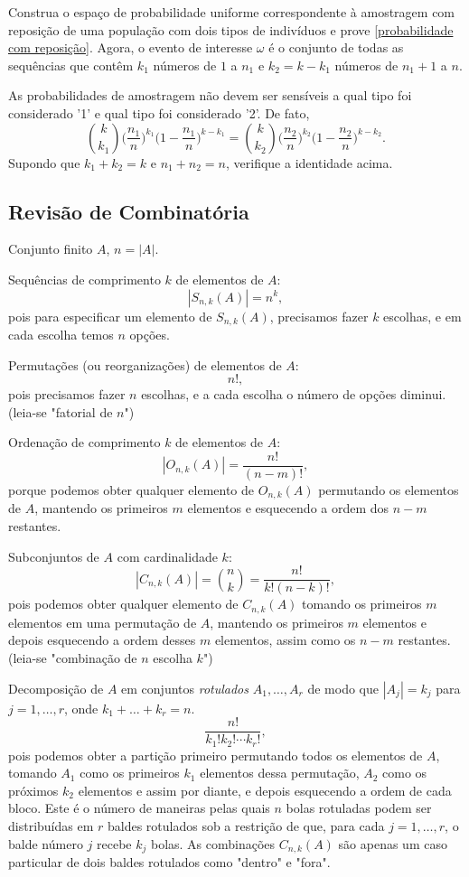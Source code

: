 \begin{exercise}
    Construa o espaço de probabilidade uniforme correspondente à amostragem com reposição de uma população com dois tipos de indivíduos e prove \eqref{probabilidade com reposição}.
    Agora, o evento de interesse $\omega$ é o conjunto de todas as sequências que contêm $k_1$ números de $1$ a $n_1$ e $k_2 = k - k_1$ números de $n_1+1$ a $n$.   
\end{exercise}

\begin{exercise}
As probabilidades de amostragem não devem ser sensíveis a qual tipo foi considerado '1' e qual tipo foi considerado '2'.
De fato,
\[
\binom{k}{k_1} \Big(\frac{n_1}{n}\Big)^{k_1} \Big(1-\frac{n_1}{n}\Big)^{k-k_1}
=
\binom{k}{k_2} \Big(\frac{n_2}{n}\Big)^{k_2} \Big(1-\frac{n_2}{n}\Big)^{k-k_2}.
\]
Supondo que $k_1+k_2=k$ e $n_1+n_2=n$, verifique a identidade acima.
\end{exercise}

\subsection*{Revisão de Combinatória}

Conjunto finito $ A $, $ n=|A| $.

Sequências de comprimento $ k $ de elementos de $ A $:
$$ |S_{n,k}(A)| = n^k ,$$
pois para especificar um elemento de
$ S_{n,k}(A) $, precisamos fazer $ k $ escolhas, e em cada escolha temos $ n $ opções.

Permutações (ou reorganizações) de elementos de $ A $:
$$ n! ,$$
pois precisamos fazer $ n $ escolhas, e a cada escolha o número de opções diminui.
(leia-se "fatorial de $ n $")

Ordenação de comprimento $ k $ de elementos de $ A $:
$$ |O_{n,k}(A) | = \frac{n!}{(n-m)!} , $$
porque podemos obter qualquer elemento de $ O_{n,k}(A) $ permutando os elementos de $ A $, mantendo os primeiros $ m $ elementos e esquecendo a ordem dos $ n-m $ restantes.

Subconjuntos de $ A $ com cardinalidade $ k $:
$$ |C_{n,k}(A)| = \binom{n}{k} = \frac{n!}{k! (n-k)!} , $$
pois podemos obter qualquer elemento de $ C_{n,k}(A) $ tomando os primeiros $ m $ elementos em uma permutação de $ A $, mantendo os primeiros $ m $ elementos e depois esquecendo a ordem desses $ m $ elementos, assim como os $ n-m $ restantes.
(leia-se "combinação de $ n $ escolha $ k $")

Decomposição de $ A $ em conjuntos \emph{rotulados} $ A_1, \dots, A_r $ de modo que $ |A_j|=k_j $ para $ j=1, \dots, r $, onde $ k_1+\dots+k_r = n $.
$$ \frac{n!}{k_1!k_2!\cdots k_r!} , $$
pois podemos obter a partição primeiro permutando todos os elementos de $ A $, tomando $ A_1 $ como os primeiros $ k_1 $ elementos dessa permutação, $ A_2 $ como os próximos $ k_2 $ elementos e assim por diante, e depois esquecendo a ordem de cada bloco.
Este é o número de maneiras pelas quais $ n $ bolas rotuladas podem ser distribuídas em $ r $ baldes rotulados sob a restrição de que, para cada $ j = 1, \dots, r $, o balde número $ j $ recebe $ k_j $ bolas.
As combinações $ C_{n,k}(A) $ são apenas um caso particular de dois baldes rotulados como "dentro" e "fora".

